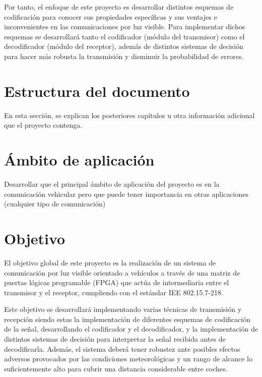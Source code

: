 Por tanto, el enfoque de este proyecto es desarrollar distintos esquemas de codificación para conocer sus propiedades específicas y
sus ventajes e inconvenientes en las comunicaciones por luz visible. Para implementar dichos esquemas se desarrollará tanto el 
codificador (módulo del transmisor) como el decodificador (módulo del receptor), además de distintos sistemas de decisión para
hacer más robusta la transmisión y disminuir la probabilidad de errores.

\section{Estructura del documento}

En esta sección, se explican los posteriores capítulos u otra información adicional que el proyecto contenga.

\section{Ámbito de aplicación}

Desarrollar que el principal ámbito de aplicación del proyecto es en la comunicación vehicular pero que puede tener importancia en otras aplicaciones (cualquier tipo de comunicación)

\section{Objetivo}
\label{sec:intro:obj}
El objetivo global de este proyecto es la realización de un sistema de comunicación por luz
visible orientado a vehículos a través de una matriz de puertas lógicas programable
(FPGA) que actúa de intermediaria entre el transmisor y el receptor, cumpliendo con el
estándar IEE 802.15.7-218.

Este objetivo se desarrollará implementando varias técnicas de transmisión y recepción siendo estas la implementación de 
diferentes esquemas de codificación de la señal, desarrollando el codificador y el decodificador, y la implementación de distintos sistemas de 
decisión para interpretar la señal recibida antes de decodificarla. 
Además, el sistema deberá tener robustez ante posibles
efectos adversos provocados por las condiciones meteorológicas y un rango de
alcance lo suficientemente alto para cubrir una distancia considerable entre coches.

\chapterend
